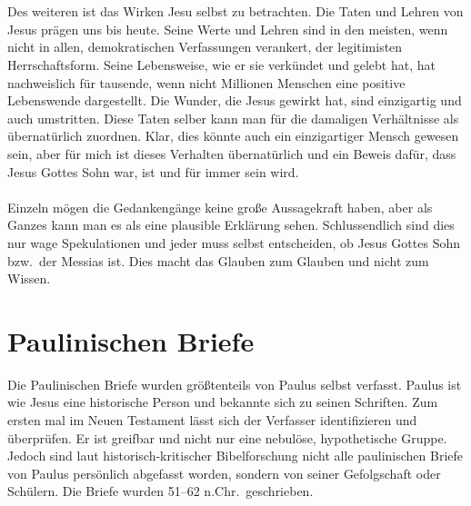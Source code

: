 \\~\\
Des weiteren ist das Wirken Jesu selbst zu betrachten. Die Taten und Lehren von Jesus prägen uns bis heute. Seine Werte und Lehren sind in den meisten, wenn nicht in allen, demokratischen Verfassungen verankert, der legitimisten Herrschaftsform. Seine Lebensweise, wie er sie verkündet und gelebt hat, hat nachweislich für tausende, wenn nicht Millionen Menschen eine positive Lebenswende dargestellt. Die Wunder, die Jesus gewirkt hat, sind einzigartig und auch umstritten. Diese Taten selber kann man für die damaligen Verhältnisse als übernatürlich zuordnen. Klar, dies könnte auch ein einzigartiger Mensch gewesen sein, aber für mich ist dieses Verhalten übernatürlich und ein Beweis dafür, dass Jesus Gottes Sohn war, ist und für immer sein wird.
\\~\\
Einzeln mögen die Gedankengänge keine große Aussagekraft haben, aber als Ganzes kann man es als eine plausible Erklärung sehen. Schlussendlich sind dies nur wage Spekulationen und jeder muss selbst entscheiden, ob Jesus Gottes Sohn bzw.\ der Messias ist. Dies macht das Glauben zum Glauben und nicht zum Wissen.
\section{Paulinischen Briefe}
Die Paulinischen Briefe wurden größtenteils von Paulus selbst verfasst. Paulus ist wie Jesus eine historische Person und bekannte sich zu seinen Schriften. Zum ersten mal im Neuen Testament lässt sich der Verfasser identifizieren und überprüfen. Er ist greifbar und nicht nur eine nebulöse, hypothetische Gruppe. Jedoch sind laut historisch-kritischer Bibelforschung nicht alle paulinischen Briefe von Paulus persönlich abgefasst worden, sondern von seiner Gefolgschaft oder Schülern. Die Briefe wurden 51--62 n.Chr.\ geschrieben.

